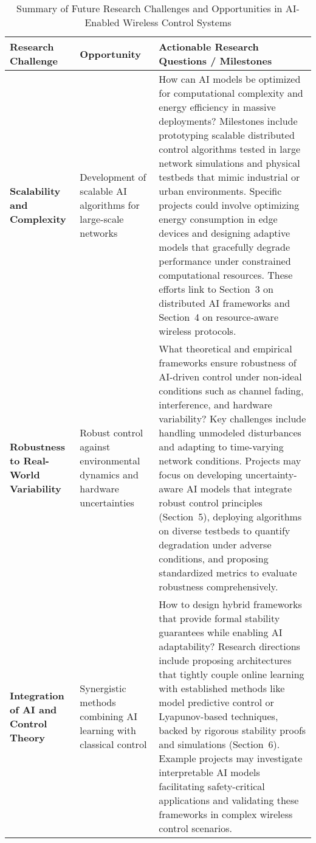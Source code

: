 \documentclass[sigconf]{acmart}
\begin{document}
\begin{table*}[htbp]
\centering
\caption{Summary of Future Research Challenges and Opportunities in AI-Enabled Wireless Control Systems}
\label{tab:future_directions}
\begin{adjustbox}{max width=\textwidth}
\begin{tabular}{@{}lll@{}}
\toprule
\textbf{Research Challenge} & \textbf{Opportunity} & \textbf{Actionable Research Questions / Milestones} \\ \midrule
\textbf{Scalability and Complexity} & Development of scalable AI algorithms for large-scale networks & How can AI models be optimized for computational complexity and energy efficiency in massive deployments? Milestones include prototyping scalable distributed control algorithms tested in large network simulations and physical testbeds that mimic industrial or urban environments. Specific projects could involve optimizing energy consumption in edge devices and designing adaptive models that gracefully degrade performance under constrained computational resources. These efforts link to Section~3 on distributed AI frameworks and Section~4 on resource-aware wireless protocols. \\
\textbf{Robustness to Real-World Variability} & Robust control against environmental dynamics and hardware uncertainties & What theoretical and empirical frameworks ensure robustness of AI-driven control under non-ideal conditions such as channel fading, interference, and hardware variability? Key challenges include handling unmodeled disturbances and adapting to time-varying network conditions. Projects may focus on developing uncertainty-aware AI models that integrate robust control principles (Section~5), deploying algorithms on diverse testbeds to quantify degradation under adverse conditions, and proposing standardized metrics to evaluate robustness comprehensively. \\
\textbf{Integration of AI and Control Theory} & Synergistic methods combining AI learning with classical control & How to design hybrid frameworks that provide formal stability guarantees while enabling AI adaptability? Research directions include proposing architectures that tightly couple online learning with established methods like model predictive control or Lyapunov-based techniques, backed by rigorous stability proofs and simulations (Section~6). Example projects may investigate interpretable AI models facilitating safety-critical applications and validating these frameworks in complex wireless control scenarios. \\

\end{tabular}
\end{adjustbox}
\end{table*}
\end{document}

